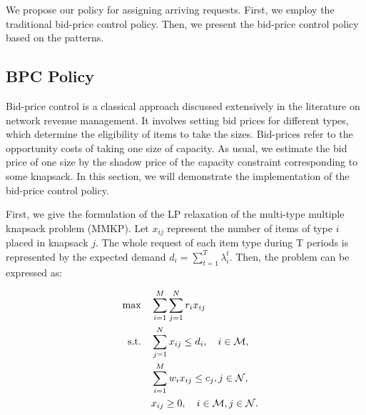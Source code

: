 We propose our policy for assigning arriving requests. First, we employ the traditional bid-price control policy. Then, we present the bid-price control policy based on the patterns.




\subsection{BPC Policy}
Bid-price control is a classical approach discussed extensively in the literature on network revenue management. It involves setting bid prices for different types, which determine the eligibility of items to take the sizes. Bid-prices refer to the opportunity costs of taking one size of capacity. As usual, we estimate the bid price of one size by the shadow price of the capacity constraint corresponding to some knapsack. In this section, we will demonstrate the implementation of the bid-price control policy. 

First, we give the formulation of the LP relaxation of the multi-type multiple knapsack problem (MMKP). Let $x_{ij}$ represent the number of items of type $i$ placed in knapsack $j$. The whole request of each item type during T periods is represented by the expected demand $d_i = \sum_{t=1}^{T} \lambda^{t}_{i}$. Then, the problem can be expressed as:

\begin{align}
\quad \max \quad & \sum_{i=1}^{M}  \sum_{j= 1}^{N} r_{i} x_{ij} \label{e0} \\
\text {s.t.} \quad & \sum_{j= 1}^{N} x_{ij} \leq d_{i}, \quad i \in \mathcal{M}, \label{deter_upper}\\ 
& \sum_{i=1}^{M} w_{i} x_{ij} \leq c_j, j \in \mathcal{N}, \label{capa_con} \\
& x_{ij} \geq 0, \quad i \in \mathcal{M}, j \in \mathcal{N}. \notag
\end{align}


